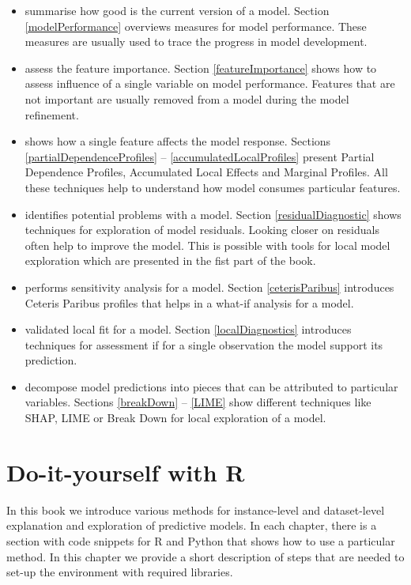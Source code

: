 \documentclass[]{krantz}
\providecommand{\tightlist}{%
  \setlength{\itemsep}{0pt}\setlength{\parskip}{0pt}}
\begin{document}
\begin{itemize}
\tightlist
\item
  summarise how good is the current version of a model. Section \ref{modelPerformance} overviews measures for model performance. These measures are usually used to trace the progress in model development.
\item
  assess the feature importance. Section \ref{featureImportance} shows how to assess influence of a single variable on model performance. Features that are not important are usually removed from a model during the model refinement.
\item
  shows how a single feature affects the model response. Sections \ref{partialDependenceProfiles} -- \ref{accumulatedLocalProfiles} present Partial Dependence Profiles, Accumulated Local Effects and Marginal Profiles. All these techniques help to understand how model consumes particular features.
\item
  identifies potential problems with a model. Section \ref{residualDiagnostic} shows techniques for exploration of model residuals. Looking closer on residuals often help to improve the model. This is possible with tools for local model exploration which are presented in the fist part of the book.
\item
  performs sensitivity analysis for a model. Section \ref{ceterisParibus} introduces Ceteris Paribus profiles that helps in a what-if analysis for a model.
\item
  validated local fit for a model. Section \ref{localDiagnostics} introduces techniques for assessment if for a single observation the model support its prediction.
\item
  decompose model predictions into pieces that can be attributed to particular variables. Sections \ref{breakDown} -- \ref{LIME} show different techniques like SHAP, LIME or Break Down for local exploration of a model.
\end{itemize}

\hypertarget{doItYourselfWithR}{%
\chapter{Do-it-yourself with R}\label{doItYourselfWithR}}

In this book we introduce various methods for instance-level and dataset-level explanation and exploration of predictive models. In each chapter, there is a section with code snippets for R and Python that shows how to use a particular method. In this chapter we provide a short description of steps that are needed to set-up the environment with required libraries.
\end{document}
